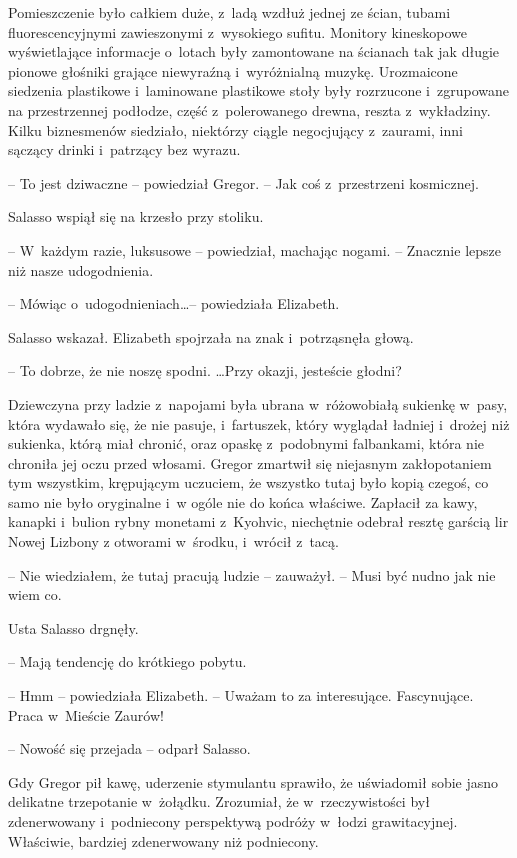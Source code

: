 \documentclass[oneside,polish,12pt,sfheadings]{mwbk}
\begin{document}
Pomieszczenie było całkiem duże, z~ladą wzdłuż jednej ze ścian, tubami
fluorescencyjnymi zawieszonymi z~wysokiego sufitu. Monitory kineskopowe
wyświetlające informacje o~lotach były zamontowane na ścianach tak jak
długie pionowe głośniki grające niewyraźną i~wyróżnialną muzykę.
Urozmaicone siedzenia plastikowe i~laminowane plastikowe stoły były
rozrzucone i~zgrupowane na przestrzennej podłodze, część z~polerowanego
drewna, reszta z~wykładziny. Kilku biznesmenów siedziało, niektórzy
ciągle negocjujący z~zaurami, inni sączący drinki i~patrzący bez wyrazu.

-- To jest dziwaczne -- powiedział Gregor. -- Jak coś z~przestrzeni
kosmicznej.

Salasso wspiął się na krzesło przy stoliku. 

-- W~każdym razie, luksusowe
-- powiedział, machając nogami. -- Znacznie lepsze niż nasze udogodnienia.

-- Mówiąc o~udogodnieniach\ldots -- powiedziała Elizabeth.

Salasso wskazał. Elizabeth spojrzała na znak i~potrząsnęła głową.

-- To dobrze, że nie noszę spodni. \ldots Przy okazji, jesteście głodni?

Dziewczyna przy ladzie z~napojami była ubrana w~różowobiałą sukienkę w~pasy, która wydawało się, że nie pasuje, i~fartuszek, który wyglądał
ładniej i~drożej niż sukienka, którą miał chronić, oraz opaskę z~podobnymi falbankami, która nie chroniła jej oczu przed włosami. Gregor
zmartwił się niejasnym zakłopotaniem tym wszystkim, krępującym uczuciem,
że wszystko tutaj było kopią czegoś, co samo nie było oryginalne i~w
ogóle nie do końca właściwe. Zapłacił za kawy, kanapki i~bulion rybny
monetami z~Kyohvic, niechętnie odebrał resztę garścią lir Nowej Lizbony
z otworami w~środku, i~wrócił z~tacą.

-- Nie wiedziałem, że tutaj pracują ludzie -- zauważył. -- Musi być nudno
jak nie wiem co.

Usta Salasso drgnęły.

-- Mają tendencję do krótkiego pobytu.

-- Hmm -- powiedziała Elizabeth. -- Uważam to za interesujące. Fascynujące.
Praca w~Mieście Zaurów!

-- Nowość się przejada -- odparł Salasso.

Gdy Gregor pił kawę, uderzenie stymulantu sprawiło, że uświadomił sobie
jasno delikatne trzepotanie w~żołądku. Zrozumiał, że w~rzeczywistości
był zdenerwowany i~podniecony perspektywą podróży w~łodzi grawitacyjnej.
Właściwie, bardziej zdenerwowany niż podniecony.
\end{document}
